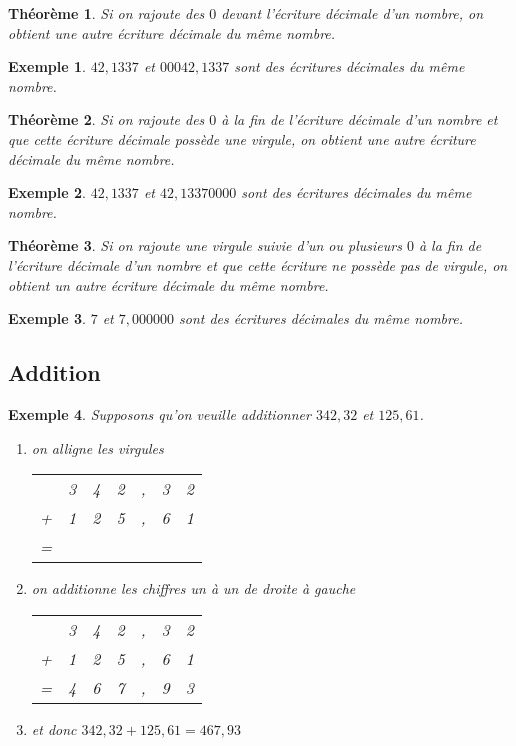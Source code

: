\documentclass[12pt]{article}
\newtheorem{theorem}{Théorème}
\newtheorem*{example}{Exemple}
\begin{document}
\begin{theorem}
  Si on rajoute des $0$ devant l'écriture décimale d'un nombre, on obtient une autre écriture décimale du même nombre.
\end{theorem}

\begin{example}
  $42,1337$ et $00042,1337$ sont des écritures décimales du même nombre.
\end{example}

\begin{theorem}
  Si on rajoute des $0$ à la fin de l'écriture décimale d'un nombre et que cette écriture décimale possède une virgule, on obtient une autre écriture décimale du même nombre.
\end{theorem}

\begin{example}
  $42,1337$ et $42,13370000$ sont des écritures décimales du même nombre.
\end{example}

\begin{theorem}
  Si on rajoute une virgule suivie d'un ou plusieurs $0$ à la fin de l'écriture décimale d'un nombre et que cette écriture ne possède pas de virgule, on obtient un autre écriture décimale du même nombre.
\end{theorem}

\begin{example}
  $7$ et $7,000000$ sont des écritures décimales du même nombre.
\end{example}

\subsection{Addition}


\begin{example}

Supposons qu'on veuille additionner $342,32$ et $125,61$.

\begin{enumerate}
 
\item on alligne les virgules

\begin{tabular}{c c c c c c c}
  & 3 & 4 & 2 & , & 3 & 2 \\
+ & 1 & 2 & 5 & , & 6 & 1 \\
\hline
=\\
\end{tabular}

\item on additionne les chiffres un à un de droite à gauche

\begin{tabular}{c c c c c c c}
  & 3 & 4 & 2 & , & 3 & 2 \\
+ & 1 & 2 & 5 & , & 6 & 1 \\
\hline
= & 4 & 6 & 7 & , & 9 & 3
\end{tabular}
 

\item et donc $342,32 + 125,61 = 467,93$
\end{enumerate}
\end{example}
\end{document}
